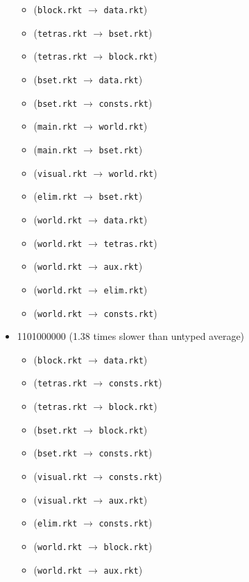 \documentclass{article}
\newcommand{\mono}[1]{\texttt{#1}}
\begin{document}
\begin{itemize}
  \begin{itemize}
  \item (\mono{block.rkt} $\rightarrow$ \mono{data.rkt})
  \item (\mono{tetras.rkt} $\rightarrow$ \mono{bset.rkt})
  \item (\mono{tetras.rkt} $\rightarrow$ \mono{block.rkt})
  \item (\mono{bset.rkt} $\rightarrow$ \mono{data.rkt})
  \item (\mono{bset.rkt} $\rightarrow$ \mono{consts.rkt})
  \item (\mono{main.rkt} $\rightarrow$ \mono{world.rkt})
  \item (\mono{main.rkt} $\rightarrow$ \mono{bset.rkt})
  \item (\mono{visual.rkt} $\rightarrow$ \mono{world.rkt})
  \item (\mono{elim.rkt} $\rightarrow$ \mono{bset.rkt})
  \item (\mono{world.rkt} $\rightarrow$ \mono{data.rkt})
  \item (\mono{world.rkt} $\rightarrow$ \mono{tetras.rkt})
  \item (\mono{world.rkt} $\rightarrow$ \mono{aux.rkt})
  \item (\mono{world.rkt} $\rightarrow$ \mono{elim.rkt})
  \item (\mono{world.rkt} $\rightarrow$ \mono{consts.rkt})
  \end{itemize}
\item 1101000000 (1.38 times slower than untyped average)
  \begin{itemize}
  \item (\mono{block.rkt} $\rightarrow$ \mono{data.rkt})
  \item (\mono{tetras.rkt} $\rightarrow$ \mono{consts.rkt})
  \item (\mono{tetras.rkt} $\rightarrow$ \mono{block.rkt})
  \item (\mono{bset.rkt} $\rightarrow$ \mono{block.rkt})
  \item (\mono{bset.rkt} $\rightarrow$ \mono{consts.rkt})
  \item (\mono{visual.rkt} $\rightarrow$ \mono{consts.rkt})
  \item (\mono{visual.rkt} $\rightarrow$ \mono{aux.rkt})
  \item (\mono{elim.rkt} $\rightarrow$ \mono{consts.rkt})
  \item (\mono{world.rkt} $\rightarrow$ \mono{block.rkt})
  \item (\mono{world.rkt} $\rightarrow$ \mono{aux.rkt})

\end{itemize}
\end{itemize}
\end{document}
